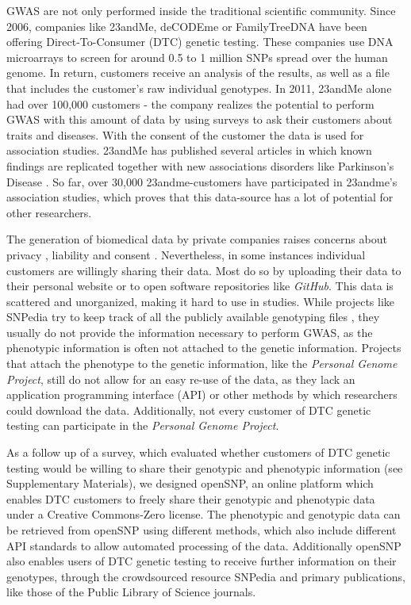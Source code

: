 \documentclass[10pt]{article}
\begin{document}
GWAS are not only performed inside the traditional scientific community. 
Since 2006, companies like 23andMe, deCODEme or FamilyTreeDNA have been offering Direct-To-Consumer (DTC) genetic testing. 
These companies use DNA microarrays to screen for around 0.5 to 1 million SNPs spread over the human genome. In return, customers 
receive an analysis of the results, as well as a file that includes the customer's raw individual genotypes. In 2011, 23andMe 
alone had over 100,000 customers \cite{23andMe2011}
- the company realizes the potential to perform GWAS with this amount of data by using surveys to ask their customers about 
traits and diseases. With the consent of the customer the data is used for association studies. 23andMe has published several 
articles in which known findings are replicated together with new associations disorders like Parkinson's Disease \cite{Eriksson2010, Do2011}. 
So far, over 30,000 23andme-customers have participated in 23andme's association studies, which proves that this data-source has a lot of potential for other researchers.

The generation of biomedical data by private companies raises concerns about privacy \cite{23andMe2012}, 
liability and consent \cite{Caulfield2011}. 
Nevertheless, in some instances individual customers are willingly sharing their data. Most do so by uploading their data to
their personal website or to open software repositories like \textit{GitHub}. 
This data is scattered and unorganized, making it hard to use in studies. While projects like SNPedia try to keep track of all 
the publicly available genotyping files \cite{Cariaso2011}, they usually do not provide the information necessary to perform GWAS, as the phenotypic information is 
often not attached to the genetic information. Projects that attach the phenotype to the genetic information, 
like the \textit{Personal Genome Project}, still do not allow for an easy re-use of the data, as they lack an application programming interface (API) 
or other methods by which researchers could download the data. Additionally, not every customer of DTC genetic testing can participate in the \textit{Personal Genome Project}.  

As a follow up of a survey, which evaluated whether customers of DTC genetic testing would be willing to share their genotypic and phenotypic information (see Supplementary Materials), we designed openSNP, an online platform which enables DTC customers to freely share their genotypic and phenotypic data under a Creative Commons-Zero license. 
The phenotypic and genotypic data can be retrieved from openSNP using different methods, which also include different API standards to allow automated processing of the data.
Additionally openSNP also enables users of DTC genetic testing to receive further information on their genotypes, through the crowdsourced resource SNPedia and primary publications, like those of the Public Library of Science journals. 
\end{document}
